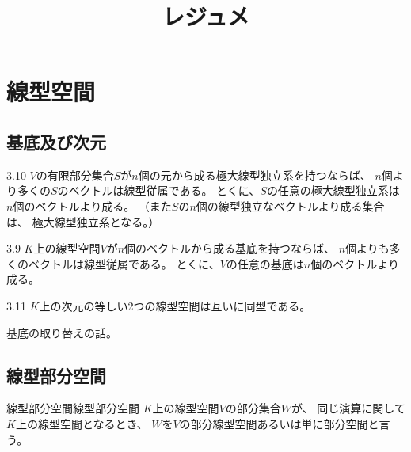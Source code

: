 \documentclass[a4paper, 10pt]{jsarticle}
\title{レジュメ}
\author{}
\begin{document}
\maketitle

\setcounter{section}{3}
\section{線型空間}
\setcounter{subsection}{2}
\subsection{基底及び次元}
\begin{thm}[code={\setcounter{\tcbcounter}{9}}]{}{3.10}
	$V$の有限部分集合$S$が$n$個の元から成る極大線型独立系を持つならば、
	$n$個より多くの$S$のベクトルは線型従属である。
	とくに、$S$の任意の極大線型独立系は$n$個のベクトルより成る。
	（また$S$の$n$個の線型独立なベクトルより成る集合は、
	極大線型独立系となる。）
\end{thm}
\begin{thm}[code={\setcounter{\tcbcounter}{8}}]{}{3.9}
	$K$上の線型空間$V$が$n$個のベクトルから成る基底を持つならば、
	$n$個よりも多くのベクトルは線型従属である。
	とくに、$V$の任意の基底は$n$個のベクトルより成る。
\end{thm}
\begin{cor}[code={\setcounter{\tcbcounter}{10}}]{}{3.11}
	$K$上の次元の等しい2つの線型空間は互いに同型である。
\end{cor}

基底の取り替えの話。

\subsection{線型部分空間}
\begin{dfn*}{線型部分空間}{線型部分空間}
	$K$上の線型空間$V$の部分集合$W$が、
	同じ演算に関して$K$上の線型空間となるとき、
	$W$を$V$の部分線型空間あるいは単に部分空間と言う。
\end{dfn*}
\end{document}
